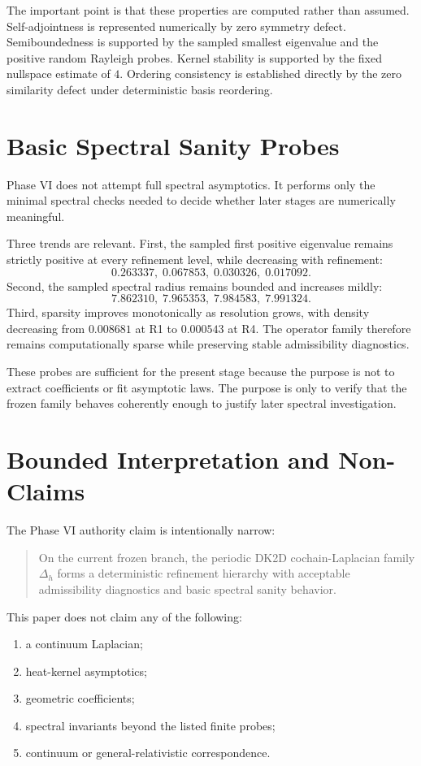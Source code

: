 \documentclass[11pt]{article}
\begin{document}
The important point is that these properties are computed rather than assumed. Self-adjointness is represented numerically by zero symmetry defect. Semiboundedness is supported by the sampled smallest eigenvalue and the positive random Rayleigh probes. Kernel stability is supported by the fixed nullspace estimate of $4$. Ordering consistency is established directly by the zero similarity defect under deterministic basis reordering.

\section{Basic Spectral Sanity Probes}

Phase VI does not attempt full spectral asymptotics. It performs only the minimal spectral checks needed to decide whether later stages are numerically meaningful.

Three trends are relevant. First, the sampled first positive eigenvalue remains strictly positive at every refinement level, while decreasing with refinement:
\[
0.263337,\;
0.067853,\;
0.030326,\;
0.017092 .
\]
Second, the sampled spectral radius remains bounded and increases mildly:
\[
7.862310,\;
7.965353,\;
7.984583,\;
7.991324 .
\]
Third, sparsity improves monotonically as resolution grows, with density decreasing from $0.008681$ at R1 to $0.000543$ at R4. The operator family therefore remains computationally sparse while preserving stable admissibility diagnostics.

These probes are sufficient for the present stage because the purpose is not to extract coefficients or fit asymptotic laws. The purpose is only to verify that the frozen family behaves coherently enough to justify later spectral investigation.

\section{Bounded Interpretation and Non-Claims}

The Phase VI authority claim is intentionally narrow:
\begin{quote}
On the current frozen branch, the periodic DK2D cochain-Laplacian family $\Delta_h$ forms a deterministic refinement hierarchy with acceptable admissibility diagnostics and basic spectral sanity behavior.
\end{quote}

This paper does not claim any of the following:
\begin{enumerate}
\item a continuum Laplacian;
\item heat-kernel asymptotics;
\item geometric coefficients;
\item spectral invariants beyond the listed finite probes;
\item continuum or general-relativistic correspondence.
\end{enumerate}
\end{document}
